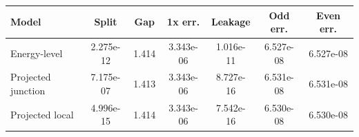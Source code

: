 \begin{tabular}{lcccccc}
\hline
Model & Split & Gap & 1x err. & Leakage & Odd err. & Even err. \\
\hline
Energy-level & 2.275e-12 & 1.414 & 3.343e-06 & 1.016e-11 & 6.527e-08 & 6.527e-08 \\
Projected junction & 7.175e-07 & 1.413 & 3.343e-06 & 8.727e-16 & 6.531e-08 & 6.531e-08 \\
Projected local & 4.996e-15 & 1.414 & 3.343e-06 & 7.542e-16 & 6.530e-08 & 6.530e-08 \\
\hline
\end{tabular}

